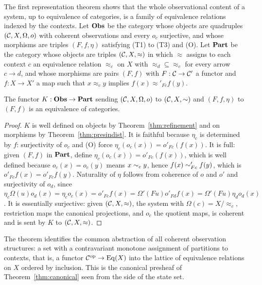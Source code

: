 The first representation theorem shows that the whole observational content of a system, up to equivalence of categories, is a family of equivalence relations indexed by the contexts. Let $\mathbf{Obs}$ be the category whose objects are quadruples $(\mathcal C,X,\Omega,o)$ with coherent observations and every $o_c$ surjective, and whose morphisms are triples $(F,f,\eta)$ satisfying (T1) to (T3) and (O). Let $\mathbf{Part}$ be the category whose objects are triples $(\mathcal C,X,{\approx})$ in which $\approx$ assigns to each context $c$ an equivalence relation $\approx_c$ on $X$ with ${\approx_d}\subseteq{\approx_c}$ for every arrow $c\to d$, and whose morphisms are pairs $(F,f)$ with $F:\mathcal C\to\mathcal C'$ a functor and $f:X\to X'$ a map such that $x\approx_cy$ implies $f(x)\approx'_{Fc}f(y)$.

\begin{theorem}\label{thm:partrep}
The functor $K:\mathbf{Obs}\to\mathbf{Part}$ sending $(\mathcal C,X,\Omega,o)$ to $(\mathcal C,X,{\sim})$ and $(F,f,\eta)$ to $(F,f)$ is an equivalence of categories.
\end{theorem}
\begin{proof}
$K$ is well defined on objects by Theorem~\ref{thm:refinement} and on morphisms by Theorem~\ref{thm:presindist}. It is faithful because $\eta_c$ is determined by $f$: surjectivity of $o_c$ and (O) force $\eta_c(o_c(x))=o'_{Fc}(f(x))$. It is full: given $(F,f)$ in $\mathbf{Part}$, define $\eta_c(o_c(x))=o'_{Fc}(f(x))$, which is well defined because $o_c(x)=o_c(y)$ means $x\sim_cy$, hence $f(x)\sim'_{Fc}f(y)$, which is $o'_{Fc}f(x)=o'_{Fc}f(y)$. Naturality of $\eta$ follows from coherence of $o$ and $o'$ and surjectivity of $o_d$, since $\eta_c\Omega(u)o_d(x)=\eta_co_c(x)=o'_{Fc}f(x)=\Omega'(Fu)o'_{Fd}f(x)=\Omega'(Fu)\eta_do_d(x)$. It is essentially surjective: given $(\mathcal C,X,{\approx})$, the system with $\Omega(c)=X/{\approx_c}$, restriction maps the canonical projections, and $o_c$ the quotient maps, is coherent and is sent by $K$ to $(\mathcal C,X,{\approx})$.
\end{proof}

The theorem identifies the common abstraction of all coherent observation structures: a set with a contravariant monotone assignment of partitions to contexts, that is, a functor $\mathcal C^{\mathrm{op}}\to\mathrm{Eq}(X)$ into the lattice of equivalence relations on $X$ ordered by inclusion. This is the canonical presheaf of Theorem~\ref{thm:canonical} seen from the side of the state set.

